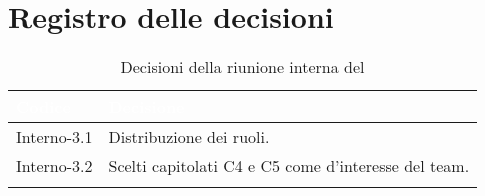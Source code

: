 \section{Registro delle decisioni}
{
\renewcommand{\arraystretch}{1.5}
\centering
\begin{longtable}{C{3cm} C{9cm}}
\textcolor{white}{\textbf{Codice}}&
\textcolor{white}{\textbf{Decisione}}\\	
\endhead
		
Interno-3.1 & Distribuzione dei ruoli.\\

Interno-3.2 & Scelti capitolati C4 e C5 come  d'interesse del team.\\
		
\caption{Decisioni della riunione interna del \Data{}}
\end{longtable}
}
